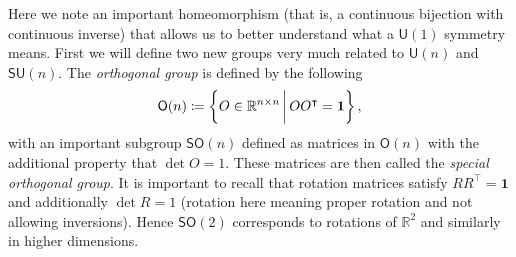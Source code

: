 Here we note an important homeomorphism (that is, a continuous bijection with
continuous inverse) that allows us to better understand what a \(\mathsf{U}(1)\)
symmetry means. First we will define two new groups very much related to
\(\mathsf{U}(n)\) and \(\mathsf{SU}(n)\). The \textit{orthogonal group} is
defined by the following
\begin{equation}
    \mathsf{O}(n)\coloneqq\left\{O\in\mathbb{R}^{n\times n}\,\bigg{|}\,OO^\intercal = \mathbf{1}\right\},
\end{equation}
with an important subgroup \(\mathsf{SO}(n)\) defined as matrices in
\(\mathsf{O}(n)\) with the additional property that \(\det O = 1\). These
matrices are then called the \textit{special orthogonal group}. It is important
to recall that rotation matrices satisfy \(RR^{\intercal} = \mathbf{1}\) and
additionally \(\det R = 1\) (rotation here meaning proper rotation and not
allowing inversions). Hence \(\mathsf{SO}(2)\) corresponds to rotations of
\(\mathbb{R}^2\) and similarly in higher dimensions.

